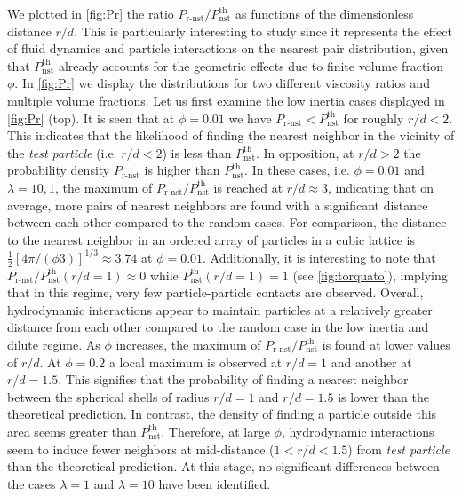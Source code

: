 We plotted in \ref{fig:Pr} the ratio $P_\text{r-nst}/P_\text{nst}^\text{th}$ as functions of the dimensionless distance $r/d$.
This is particularly interesting to study since it represents the effect of fluid dynamics and particle interactions on the nearest pair distribution, given that $P_\text{nst}^\text{th}$ already accounts for the geometric effects due to finite volume fraction $\phi$. 
In \ref{fig:Pr} we display the distributions for two different viscosity ratios and multiple volume fractions. 
Let us first examine the low inertia cases displayed in \ref{fig:Pr} (top). 
It is seen that at $\phi = 0.01$ we have $P_\text{r-nst} < P_\text{nst}^\text{th}$ for roughly $r/d < 2$.
This indicates that the likelihood of finding the nearest neighbor in the vicinity of the \textit{test particle} (i.e. $r/d<2$) is less than $P_\text{nst}^\text{th}$.
In opposition, at $r/d>2$ the probability density $P_\text{r-nst}$ is higher than $P_\text{nst}^\text{th}$.
In these cases, i.e. $\phi = 0.01$ and $\lambda = 10, 1$, the maximum of $P_\text{r-nst}/P_\text{nst}^\text{th}$ is reached at $r/d \approx 3$, indicating that on average, more pairs of nearest neighbors are found with a significant distance between each other compared to the random cases. 
For comparison, the distance to the nearest neighbor in an ordered array of particles in a cubic lattice is  $\frac{1}{2}\left[4\pi/(\phi 3)\right]^{1/3} \approx 3.74$ at $\phi = 0.01$.
Additionally, it is interesting to note that $P_\text{r-nst}/P_\text{nst}^\text{th}(r/d =1) \approx 0$ while $P_\text{nst}^\text{th}(r/d =1) = 1$ (see \ref{fig:torquato}), implying that in this regime, very few particle-particle contacts are observed. 
Overall, hydrodynamic interactions appear to maintain particles at a relatively greater distance from each other compared to the random case in the low inertia and dilute regime.
As $\phi$ increases, the maximum of $P_\text{r-nst}/P_\text{nst}^\text{th}$ is found at lower values of $r/d$. 
At $\phi = 0.2$ a local maximum is observed at $r/d = 1$ and another at $r/d = 1.5$.
This signifies that the probability of finding a nearest neighbor between the spherical shells of radius $r/d = 1$ and $r/d = 1.5$ is lower than the theoretical prediction.
In contrast, the density of finding a particle outside this area seems greater than $P_\text{nst}^\text{th}$. 
Therefore, at large $\phi$, hydrodynamic interactions seem to induce fewer neighbors at mid-distance ($1<r/d<1.5$) from \textit{test particle} than the theoretical prediction. 
At this stage, no significant differences between the cases $\lambda = 1$ and $\lambda = 10$ have been identified.

